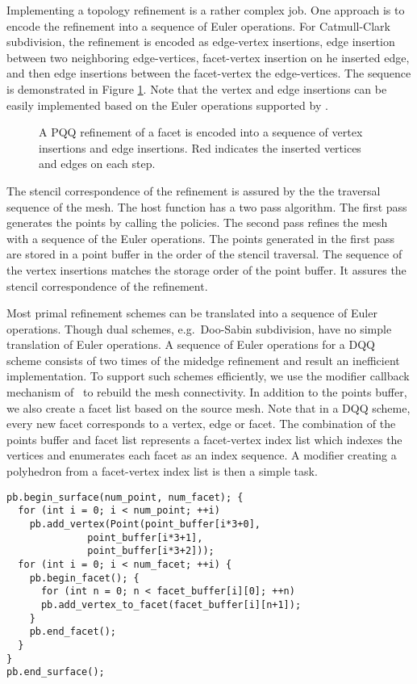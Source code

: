 Implementing a topology refinement is a rather complex job.  One
approach is to encode the refinement into a sequence of Euler
operations. For Catmull-Clark subdivision, the refinement is encoded
as edge-vertex insertions, edge insertion between two neighboring
edge-vertices, facet-vertex insertion on he inserted edge, and then
edge insertions between the facet-vertex the edge-vertices. 
The sequence is demonstrated in Figure \ref{fig:CCRefinement}. 
Note that the vertex and edge insertions can be easily 
implemented based on the Euler operations supported by \cgalpoly.
\begin{figure}
  \centering
  \caption{A PQQ refinement of a facet is encoded into a sequence of
  vertex insertions and edge insertions. Red indicates the inserted
  vertices and edges on each step.}
  \label{fig:CCRefinement}
\end{figure}

The stencil correspondence of the refinement is assured
by the the traversal sequence of the mesh. The host function
has a two pass algorithm. The first pass generates the
points by calling the policies. The second pass
refines the mesh with a sequence of the Euler operations.
The points generated in the first pass are stored in a
point buffer in the order of the stencil 
traversal. The sequence of the vertex insertions 
matches the storage order of the point buffer. It assures 
the stencil correspondence of the refinement.

Most primal refinement schemes can be translated into a sequence of
Euler operations. Though dual schemes, e.g.\ Doo-Sabin subdivision,
have no simple translation of Euler operations. A sequence
of Euler operations for a DQQ scheme consists of two times 
of the midedge refinement \cite{Peters:1997:SSS} and 
result an inefficient implementation.
To support such schemes efficiently, we use the modifier 
callback mechanism of \cgalpoly\ to rebuild the mesh
connectivity. In addition to the points buffer, we
also create a facet list based on the source mesh. Note that in a DQQ
scheme, every new facet corresponds to a vertex, edge or facet. The
combination of the points buffer and facet list represents a
facet-vertex index list which indexes the vertices and enumerates each
facet as an index sequence. A modifier creating a polyhedron from a
facet-vertex index list is then a simple task.
\begin{lstlisting}
pb.begin_surface(num_point, num_facet); {
  for (int i = 0; i < num_point; ++i) 
    pb.add_vertex(Point(point_buffer[i*3+0], 
	          point_buffer[i*3+1], 
	          point_buffer[i*3+2]));	
  for (int i = 0; i < num_facet; ++i) {
    pb.begin_facet(); {
      for (int n = 0; n < facet_buffer[i][0]; ++n)
      pb.add_vertex_to_facet(facet_buffer[i][n+1]);
    }
    pb.end_facet();
  }
}
pb.end_surface();
\end{lstlisting}

